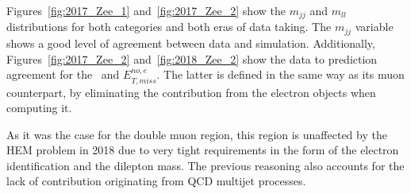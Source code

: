 \hspace{10pt} Figures~\ref{fig:2017_Zee_1} and~\ref{fig:2017_Zee_2} show the $m_{jj}$ and $m_{ll}$ distributions for both categories and both eras of data taking. The $m_{jj}$ variable shows a good level of agreement between data and simulation. Additionally, Figures~\ref{fig:2017_Zee_2} and~\ref{fig:2018_Zee_2} show the data to prediction agreement for the \mindphinoe~and $E_{T, miss}^{no, e}$. The latter is defined in the same way as its muon counterpart, by eliminating the contribution from the electron objects when computing it.

\hspace{10pt} As it was the case for the double muon region, this region is unaffected by the HEM problem in 2018 due to very tight requirements in the form of the electron identification and the dilepton mass. The previous reasoning also accounts for the lack of contribution originating from QCD multijet processes.

